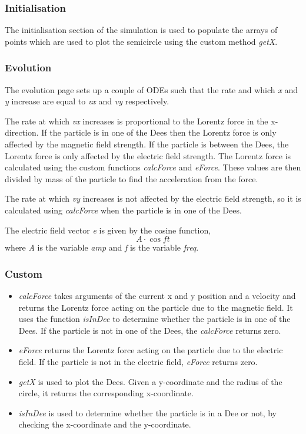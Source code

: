\subsubsection*{Initialisation}
\label{sec-1-3-2}

The initialisation section of the simulation is used to populate the
arrays of points which are used to plot the semicircle using the
custom method \emph{getX}.
\subsubsection*{Evolution}
\label{sec-1-3-3}

The evolution page sets up a couple of ODEs such that the rate and which \emph{x} and \emph{y} increase are equal to \emph{vx} and \emph{vy} respectively.

The rate at which \emph{vx} increases is proportional to the Lorentz force in the
x-direction. If the particle is in one of the Dees then the Lorentz
force is only affected by the magnetic field strength. If the particle
is between the Dees, the Lorentz force is only affected by the
electric field strength. The Lorentz force is calculated using the
custom functions \emph{calcForce} and \emph{eForce}. These values are then
divided by mass of the particle to find the acceleration from the
force.

The rate at which \emph{vy} increases is not affected by the electric field
strength, so it is calculated using \emph{calcForce} when the particle is
in one of the Dees.

The electric field vector \emph{e} is given by the cosine
function, \[ A\cdot\cos{f t} \] where \emph{A} is the variable \emph{amp} and
\emph{f} is the variable \emph{freq}.
\subsubsection*{Custom}
\label{sec-1-3-4}

\begin{itemize}
\item \emph{calcForce} takes arguments of the current x and y position and a
  velocity and returns the Lorentz force acting on the particle due to
  the magnetic field. It uses the function \emph{isInDee} to determine
  whether the particle is in one of the Dees. If the particle is not
  in one of the Dees, the \emph{calcForce} returns zero.
\item \emph{eForce} returns the Lorentz force acting on the particle due to the
  electric field. If the particle is not in the electric field,
  \emph{eForce} returns zero.
\item \emph{getX} is used to plot the Dees. Given a y-coordinate and the radius
  of the circle, it returns the corresponding x-coordinate.
\item \emph{isInDee} is used to determine whether the particle is in a Dee or
  not, by checking the x-coordinate and the y-coordinate.
\end{itemize}
